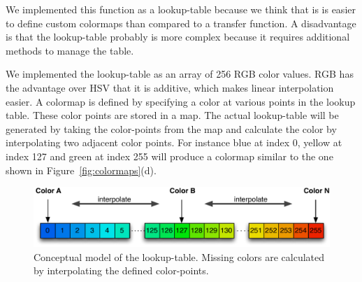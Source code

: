 We implemented this function as a lookup-table because we think that is is easier to define custom colormaps than compared to a transfer function. A disadvantage is that the lookup-table probably is more complex because it requires additional methods to manage the table.

We implemented the lookup-table as an array of 256 RGB color values. RGB has the advantage over HSV that it is additive, which makes linear interpolation easier. A colormap is defined by specifying a color at various points in the lookup table. These color points are stored in a map. The actual lookup-table will be generated by taking the color-points from the map and calculate the color by interpolating two adjacent color points. For instance blue at index 0, yellow at index 127 and green at index 255 will produce a colormap similar to the one shown in Figure~\ref{fig:colormaps}(d). 

\begin{figure}[htbp]
    \centering
    \includegraphics[width=.8\textwidth]{figures/colormaps/lookuptable.pdf}
    \caption{Conceptual model of the lookup-table. Missing colors are calculated by interpolating the defined color-points.}
    \label{fig:lookupTable}
\end{figure}

